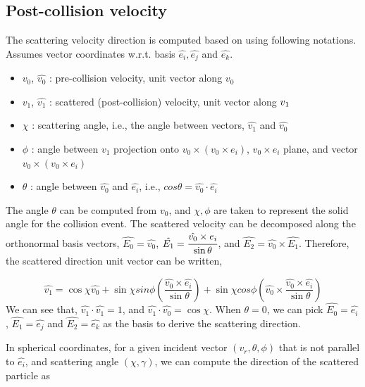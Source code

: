 \documentclass{article}[draft]
\begin{document}
\subsection{Post-collision velocity}
The scattering velocity direction is computed based on using following notations. Assumes vector coordinates w.r.t. basis $\hat{e_i},\hat{e_j}$ and $\hat{e_k}$.

\begin{itemize}
    \item $v_0$, $\hat{v_0}$ : pre-collision velocity, unit vector along $v_0$
    \item $v_1$, $\hat{v_1}$ : scattered (post-collision) velocity, unit vector along $\boldmath{v_1}$
    \item $\chi$ : scattering angle, i.e., the angle between vectors, $\hat{v_1}$ and  $\hat{v_0}$
    \item $\phi$ : angle between $v_1$ projection onto $v_0 \times(v_0 \times e_i)$, $v_0 \times e_i$ plane, and vector $v_0 \times(v_0 \times e_i)$
    \item $\theta$ : angle between $\hat{v_0}$ and $\hat{e_i}$, i.e., $cos\theta = \hat{v_0} \cdot \hat{e_i}$
\end{itemize}
The angle $\theta$ can be computed from $v_0$, and $\chi,\phi$ are taken to represent the solid angle for the collision event. The scattered velocity can be decomposed along the orthonormal basis vectors, $\hat{E_0}=\hat{v_{0}}$, $\hat{E_1}= \cfrac{\hat{v_0}\times e_i}{\sin\theta}$, and $\hat{E_2}= \hat{v_0}\times \hat{E_1}$. Therefore, the scattered direction unit vector can be written, 

\begin{equation}
    \hat{v_1} = \cos\chi \hat{v_0} + \sin\chi sin\phi (\frac{\hat{v_0}\times \hat{e_i}}{\sin\theta}) + \sin\chi cos\phi (\hat{v_0}\times \frac{\hat{v_0}\times \hat{e_i}}{\sin\theta}) \label{eq:scatter}
\end{equation}
We can see that, $\hat{v_1}\cdot \hat{v_1}=1$, and $\hat{v_1} \cdot \hat{v_0}= \cos\chi$.
When $\theta = 0 $, we can pick $\hat{E_0}=\hat{e_i}$, $\hat{E_1}=\hat{e_j}$ and $\hat{E_2}=\hat{e_k}$ as the basis to derive the scattering direction. 

In spherical coordinates, for a given incident vector $(v_r,\theta,\phi)$ that is not parallel to $\hat{e_i}$,  and scattering angle $(\chi,\gamma)$, we can compute the direction of the scattered particle as 
\end{document}
